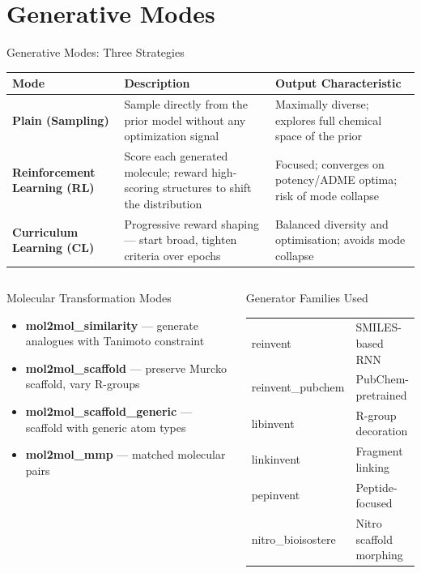 \documentclass[aspectratio=169]{beamer}
\begin{document}
\section{Generative Modes}

\begin{frame}{Generative Modes: Three Strategies}
  \centering
  \small
  \begin{tabular}{p{2.8cm}p{3.8cm}p{4.5cm}}
    \toprule
    \textbf{Mode} & \textbf{Description} & \textbf{Output Characteristic} \\
    \midrule
    \textbf{Plain (Sampling)} &
    Sample directly from the prior model without any optimization signal &
    Maximally diverse; explores full chemical space of the prior \\[0.4em]
    \textbf{Reinforcement Learning (RL)} &
    Score each generated molecule; reward high-scoring structures to shift the distribution &
    Focused; converges on potency/ADME optima; risk of mode collapse \\[0.4em]
    \textbf{Curriculum Learning (CL)} &
    Progressive reward shaping --- start broad, tighten criteria over epochs &
    Balanced diversity and optimisation; avoids mode collapse \\
    \bottomrule
  \end{tabular}
  \vspace{0.6em}
  \begin{columns}
    \begin{block}{Molecular Transformation Modes}
      \small
      \begin{itemize}
        \item \textbf{mol2mol\_similarity} --- generate analogues with Tanimoto constraint
        \item \textbf{mol2mol\_scaffold} --- preserve Murcko scaffold, vary R-groups
        \item \textbf{mol2mol\_scaffold\_generic} --- scaffold with generic atom types
        \item \textbf{mol2mol\_mmp} --- matched molecular pairs
      \end{itemize}
    \end{block}
    \begin{block}{Generator Families Used}
      \small
      \begin{tabular}{ll}
        reinvent & SMILES-based RNN \\
        reinvent\_pubchem & PubChem-pretrained \\
        libinvent & R-group decoration \\
        linkinvent & Fragment linking \\
        pepinvent & Peptide-focused \\
        nitro\_bioisostere & Nitro scaffold morphing \\
      \end{tabular}
    \end{block}
  \end{columns}
\end{frame}
\end{document}
